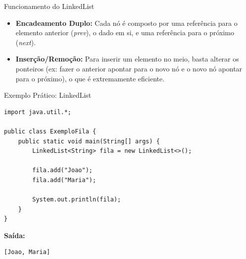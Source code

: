\documentclass[9pt]{beamer}
\begin{document}
\begin{frame}{Funcionamento do LinkedList}
    \begin{center}
    \end{center}
    \vspace{0.5cm}
    \begin{itemize}
        \item \textbf{Encadeamento Duplo:} Cada nó é composto por uma referência para o elemento anterior (\textit{prev}), o dado em si, e uma referência para o próximo (\textit{next}).
        \item \textbf{Inserção/Remoção:} Para inserir um elemento no meio, basta alterar os ponteiros (ex: fazer o anterior apontar para o novo nó e o novo nó apontar para o próximo), o que é extremamente eficiente.
    \end{itemize}
\end{frame}

\begin{frame}[fragile]{Exemplo Prático: LinkedList}
    \begin{lstlisting}
import java.util.*;

public class ExemploFila {
    public static void main(String[] args) {
        LinkedList<String> fila = new LinkedList<>();

        fila.add("Joao");
        fila.add("Maria");
        
        System.out.println(fila);
    }
}
    \end{lstlisting}
    \textbf{Saída:}
    \begin{lstlisting}[numbers=none, backgroundcolor=\color{white}]
[Joao, Maria]
    \end{lstlisting}
\end{frame}
\end{document}
